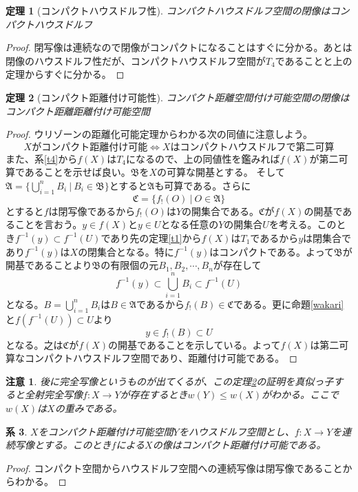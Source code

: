 \documentclass[leqno]{jsarticle}
\newtheorem{thm}{定理}
\newtheorem{cor}[thm]{系}
\newtheorem*{cau}{注意}
\newcommand{\dpst}{\displaystyle}
\begin{document}
\begin{thm}[コンパクトハウスドルフ性]
コンパクトハウスドルフ空間の閉像はコンパクトハウスドルフ
\end{thm}
\begin{proof}
閉写像は連続なので閉像がコンパクトになることはすぐに分かる。あとは閉像のハウスドルフ性だが、コンパクトハウスドルフ空間が$T_4$であることと上の定理からすぐに分かる。
\end{proof}


\begin{thm}[コンパクト距離付け可能性]\label{kyori}
コンパクト距離空間付け可能空間の閉像はコンパクト距離距離付け可能空間
\end{thm}
\begin{proof}
ウリゾーンの距離化可能定理からわかる次の同値に注意しよう。
\[
Xがコンパクト距離付け可能\iff Xはコンパクトハウスドルフで第二可算
\]
また、系\ref{t4}から$f(X)$は$T_4$になるので、上の同値性を鑑みれば$f(X)$が第二可算であることを示せば良い。$\mathfrak{B}$を$X$の可算な開基とする。
そして$\dpst \mathfrak{A}=\{\bigcup_{i=1}^n{B_i}\ |\ B_i\in \mathfrak{B}\}$とすると$\mathfrak{A}$も可算である。さらに
\[
\mathfrak{C}=\{f_!(O)\ |\ O\in \mathfrak{A}\}
\]
とすると$f$は閉写像であるから$f_!(O)$は$Y$の開集合である。$\mathfrak{C}$が$f(X)$の開基であることを言おう。$y\in f(X)$と$y\in U$となる任意の$Y$の開集合$U$を考える。このとき$f^{-1}(y)\subset f^{-1}(U)$であり先の定理\ref{t1}から$f(X)$は$T_1$であるから$y$は閉集合であり$f^{-1}(y)$は$X$の閉集合となる。特に$f^{-1}(y)$はコンパクトである。よって$\mathfrak{B}$が開基であることより$\mathfrak{B}$の有限個の元$B_1,B_2,\cdots ,B_n$が存在して
\[
f^{-1}(y)\subset \bigcup_{i=1}^nB_i\subset f^{-1}(U)
\]
となる。$\dpst B=\bigcup_{i=1}^nB_i$は$B\in \mathfrak{A}$であるから$f_!(B)\in \mathfrak{C}$である。更に命題\ref{wakari}と$f(f^{-1}(U))\subset U $より
\[
y\in f_!(B)\subset U 
\]
となる。之は$\mathfrak{C}$が$f(X)$の開基であることを示している。よって$f(X)$は第二可算なコンパクトハウスドルフ空間であり、距離付け可能である。
\end{proof}
\begin{cau}
後に完全写像というものが出てくるが、この定理\ref{kyori}の証明を真似っ子すると全射完全写像$f:X\to Y$が存在するとき$w(Y)\le w(X)$がわかる。ここで$w(X)$は$X$の重みである。
\end{cau}

\begin{cor}
$X$をコンパクト距離付け可能空間$Y$をハウスドルフ空間とし、$f:X\to Y$を連続写像とする。このとき$f$による$X$の像はコンパクト距離付け可能である。
\end{cor}
\begin{proof}
コンパクト空間からハウスドルフ空間への連続写像は閉写像であることからわかる。
\end{proof}
\end{document}
